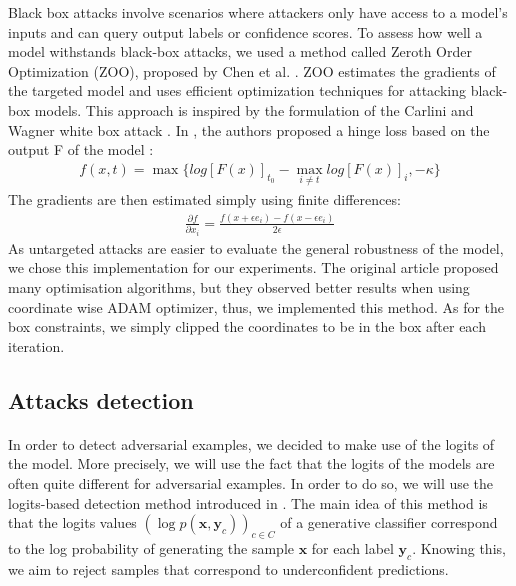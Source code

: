 \documentclass[11pt,twocolumn,letterpaper]{article}
\begin{document}
Black box attacks involve scenarios where attackers only have access to a model's inputs and can query output labels or confidence scores. To assess how well a model withstands black-box attacks, we used a method called Zeroth Order Optimization (ZOO), proposed by Chen et al. \cite{Chen_2017}. ZOO estimates the gradients of the targeted model and uses efficient optimization techniques for attacking black-box models.
This approach is inspired by the formulation of the Carlini and Wagner white box attack \cite{robustness}.
In \cite{Chen_2017}, the authors proposed a hinge loss based on the output F of the model :
\begin{align*}
    f(x,t) = \max \{log[F(x)]_{t_0} - \max_{i \neq t}log[F(x)]_i, -\kappa \}
\end{align*}
The gradients are then estimated simply using finite differences:
\begin{align*}
    \frac{\partial f}{\partial x_i} = \frac{f(x + \epsilon e_i) - f(x - \epsilon e_i)}{2 \epsilon}
\end{align*}
As untargeted attacks are easier to evaluate the general robustness of the model, we chose this implementation for our experiments. The original article proposed many optimisation algorithms, but they observed better results when using coordinate wise ADAM optimizer, thus, we implemented this method. As for the box constraints, we simply clipped the coordinates to be in the box after each iteration.

\subsection{Attacks detection}

\paragraph{} In order to detect adversarial examples, we decided to make use of the logits of the model. More precisely, we will use the fact that the logits of the models are often quite different for adversarial examples. In order to do so, we will use the logits-based detection method introduced in \cite{main_paper}. The main idea of this method is that the logits values $(\log{p(\bm{x}, \bm{y}_c)})_{c \in C}$ of a generative classifier correspond to the log probability of generating the sample $\bm{x}$ for each label $\bm{y}_c$. Knowing this, we aim to reject samples that correspond to underconfident predictions. 
\end{document}
